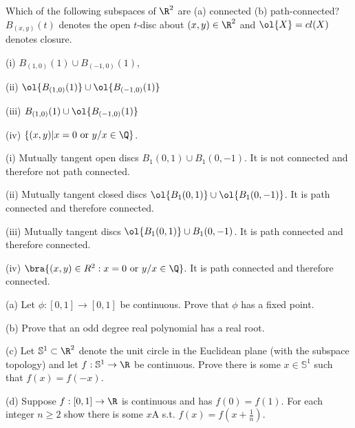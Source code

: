 \begin{problem}
Which of the following subspaces of $\R^2$ are (a) connected (b) path-connected? $B_{(x,y)}(t)$ denotes the open $t$-disc about $(x, y) \in \R^2$ and $\ol{X} = cl(X)$ denotes closure.
\ben
\item [(i)] $B_{(1,0)}(1) \cup B_{(-1,0)}(1)$,
\item [(ii)] $\ol{B_{(1,0)}(1)} \cup \ol{B_{(-1,0)}(1)}$
\item [(iii)] $B_{(1,0)}(1) \cup \ol{B_{(-1,0)}(1)}$
\item [(iv)] $\{(x, y) | x = 0 \text{ or }y/x \in \Q\}$.
\een
\end{problem}

\begin{solution}[\bf Solution.]
\ben
\item [(i)] Mutually tangent open discs $B_1(0,1)\cup B_1(0,-1)$. It is not connected and therefore not path connected.
\item [(ii)] Mutually tangent closed discs $\ol{B_1(0,1)}\cup \ol{B_1(0,-1)}$. It is path connected and therefore connected.
\item [(iii)] Mutually tangent discs $\ol{B_1(0,1)}\cup B_1(0,-1)$. It is path connected and therefore connected.
\item [(iv)] $\bra{(x,y)\in R^2:x=0 \text{ or } y/x \in \Q}$. It is path connected and therefore connected.
\een
\end{solution}


\begin{problem}
\ben
\item [(a)] Let $\phi : [0, 1] \to [0, 1]$ be continuous. Prove that $\phi$ has a fixed point.
\item [(b)] Prove that an odd degree real polynomial has a real root.
\item [(c)] Let $\mathbb{S}^1 \subset \R^2$ denote the unit circle in the Euclidean plane (with the subspace topology) and let $f : \mathbb{S}^1 \to \R$ be continuous. Prove there is some $x \in \mathbb{S}^1$ such that $f(x) = f(-x)$.
\item [(d)] Suppose $f : [0, 1] \to \R$ is continuous and has $f(0) = f(1)$. For each integer $n \geq 2$ show there is some $x$A s.t. $f(x) = f(x + \tfrac 1n)$.
\een
\end{problem}

